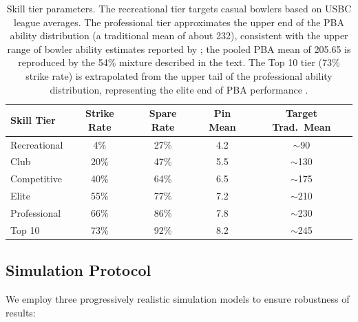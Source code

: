 \documentclass[USenglish]{article}
\theoremstyle{dgthm}
\theoremstyle{dgdef}
\begin{document}
\begin{table}[!ht]
\caption{Skill tier parameters. The recreational tier targets casual bowlers based on USBC league averages. The professional tier approximates the upper end of the PBA ability distribution (a traditional mean of about 232), consistent with the upper range of bowler ability estimates reported by \citet{mccarthy2011}; the pooled PBA mean of 205.65 is reproduced by the 54\% mixture described in the text. The Top 10 tier (73\% strike rate) is extrapolated from the upper tail of the professional ability distribution, representing the elite end of PBA performance \citep{yaari2012,vanderwerken2018}.}
\begin{tabular}{lcccc}
Skill Tier & Strike Rate & Spare Rate & Pin Mean & Target Trad.\ Mean \\ \midrule
Recreational & 4\% & 27\% & 4.2 & $\sim$90 \\
Club & 20\% & 47\% & 5.5 & $\sim$130 \\
Competitive & 40\% & 64\% & 6.5 & $\sim$175 \\
Elite & 55\% & 77\% & 7.2 & $\sim$210 \\
Professional & 66\% & 86\% & 7.8 & $\sim$230 \\
Top 10 & 73\% & 92\% & 8.2 & $\sim$245 \\
\end{tabular}
\label{tab:tiers}
\end{table}

\subsection{Simulation Protocol}
\label{sec:protocol}

We employ three progressively realistic simulation models to ensure robustness of results:
\end{document}
